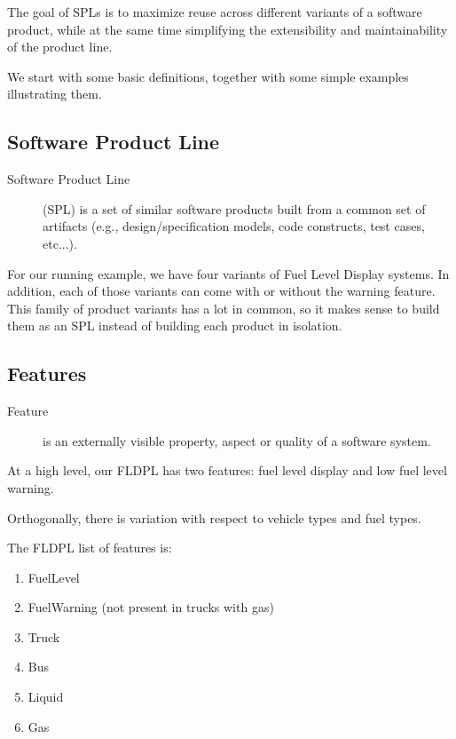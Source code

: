 \documentclass[11pt]{article}
\begin{document}
The goal of SPLs is to maximize reuse across different variants of a software product, while at the same time simplifying the extensibility and maintainability of the product line.

We start with some basic definitions, together with some simple examples illustrating them.

\subsection{Software Product Line}

\begin{description}

\item[Software Product Line]
(SPL) is a set of similar software products built from a common set of artifacts (e.g., design/specification models, code constructs, test cases, etc...).

\end{description}

For our running example, we have four variants of Fuel Level Display systems. In addition, each of those variants can come with or without the warning feature. This family of product variants has a lot in common, so it makes sense to build them as an SPL instead of building each product in isolation.

\subsection{Features}

\begin{description}

\item[Feature]
is an externally visible property, aspect or quality of a software system.

\end{description}

At a high level, our FLDPL has two features: fuel level display and low fuel level warning.

Orthogonally, there is variation with respect to vehicle types and fuel types. 

The FLDPL list of features is:

\begin{enumerate}
\item FuelLevel
\item FuelWarning (not present in trucks with gas)
\item Truck
\item Bus
\item Liquid
\item Gas
\end{enumerate}
\end{document}
